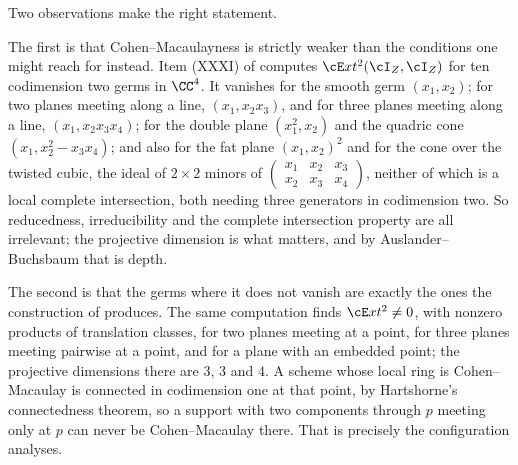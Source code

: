 \begin{remark}%
\label{rem:cmsharp}
Two observations make  the right statement.

The first is that Cohen--Macaulayness is strictly weaker than the conditions
one might reach for instead. Item (XXXI) of  computes
$\cE xt^{2}(\cI_{Z},\cI_{Z})$ for ten codimension two germs in $\CC^{4}$. It
vanishes for the smooth germ $(x_{1},x_{2})$; for two planes meeting along a
line, $(x_{1},x_{2}x_{3})$, and for three planes meeting along a line,
$(x_{1},x_{2}x_{3}x_{4})$; for the double plane $(x_{1}^{2},x_{2})$ and the
quadric cone $(x_{1},x_{2}^{2}-x_{3}x_{4})$; and also for the fat plane
$(x_{1},x_{2})^{2}$ and for the cone over the twisted cubic, the ideal of
$2\times2$ minors of $\left(\begin{smallmatrix}x_{1}&x_{2}&x_{3}\\
x_{2}&x_{3}&x_{4}\end{smallmatrix}\right)$, neither of which is a local
complete intersection, both needing three generators in codimension two. So
reducedness, irreducibility and the complete intersection property are all
irrelevant; the projective dimension is what matters, and by
Auslander--Buchsbaum that is depth.

The second is that the germs where it does not vanish are exactly the ones
the construction of  produces. The same computation finds
$\cE xt^{2}\ne0$, with nonzero products of translation classes, for two planes
meeting at a point, for three planes meeting pairwise at a point, and for a
plane with an embedded point; the projective dimensions there are $3$, $3$ and
$4$. A scheme whose local ring is Cohen--Macaulay is connected in codimension
one at that point, by Hartshorne's connectedness theorem, so a support with
two components through $p$ meeting only at $p$ can never be Cohen--Macaulay
there. That is precisely the configuration  analyses.
\end{remark}

